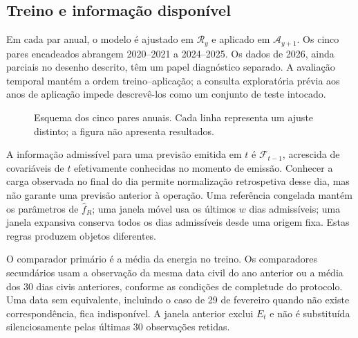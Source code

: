 \subsection{Treino e informação disponível}
\label{sec:mat-tempo}
Em cada par anual, o modelo é ajustado em $\mathcal R_y$ e aplicado em $\mathcal A_{y+1}$. Os cinco pares encadeados abrangem 2020--2021 a 2024--2025. Os dados de 2026, ainda parciais no desenho descrito, têm um papel diagnóstico separado. A avaliação temporal mantém a ordem treino--aplicação\parencite{Tashman2000}; a consulta exploratória prévia aos anos de aplicação impede descrevê-los como um conjunto de teste intocado.

\begin{figure}[htbp]
\centering
{}
\caption{Esquema dos cinco pares anuais. Cada linha representa um ajuste distinto; a figura não apresenta resultados.}
\label{fig:mat-pares}
\end{figure}

A informação admissível para uma previsão emitida em $t$ é $\mathcal F_{t-1}$, acrescida de covariáveis de $t$ efetivamente conhecidas no momento de emissão. Conhecer a carga observada no final do dia permite normalização retrospetiva desse dia, mas não garante uma previsão anterior à operação. Uma referência congelada mantém os parâmetros de $\widehat f_R$; uma janela móvel usa os últimos $w$ dias admissíveis; uma janela expansiva conserva todos os dias admissíveis desde uma origem fixa. Estas regras produzem objetos diferentes\parencite{PesaranTimmermann2007}.

O comparador primário é a média da energia no treino. Os comparadores secundários usam a observação da mesma data civil do ano anterior ou a média dos 30 dias civis anteriores, conforme as condições de completude do protocolo. Uma data sem equivalente, incluindo o caso de 29 de fevereiro quando não existe correspondência, fica indisponível. A janela anterior exclui $E_t$ e não é substituída silenciosamente pelas últimas 30 observações retidas.

